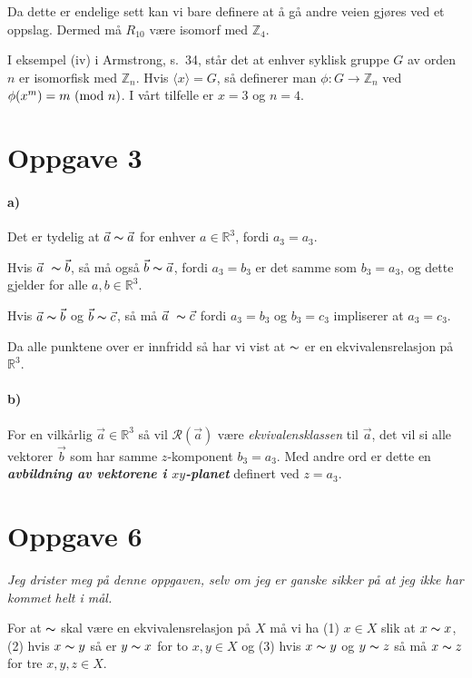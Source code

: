 \documentclass[a4paper,norsk,twocolumn,10pt]{article}
\begin{document}
Da dette er endelige sett kan vi bare definere at å gå andre veien gjøres ved
et oppslag. Dermed må $R_{10}$ være isomorf med $\mathbb{Z}_4$.

I eksempel (iv) i Armstrong, s.~34, står det at enhver syklisk gruppe $G$ av
orden $n$ er isomorfisk med $\mathbb{Z}_n$. Hvis $\langle x \rangle = G$, så
definerer man $\phi\colon G \rightarrow \mathbb{Z}_n$ ved $\phi{(x^m)} = m
\ (\text{mod}\ n)$. I vårt tilfelle er $x=3$ og $n=4$.

\section*{Oppgave 3}
\paragraph{\textbf{a)}}
Det er tydelig at $\vec{a} \thicksim \vec{a}$ for enhver $a\in \mathbb{R}^3$,
fordi $a_3=a_3$.

Hvis $\vec{a} \thicksim \vec{b}$, så må også $\vec{b} \thicksim \vec{a}$, fordi
$a_3=b_3$ er det samme som $b_3=a_3$, og dette gjelder for alle $a,b \in
\mathbb{R}^3$.

Hvis $\vec{a} \thicksim \vec{b}$ og $\vec{b} \thicksim \vec{c}$, så må
$\vec{a} \thicksim \vec{c}$ fordi $a_3=b_3$ og $b_3=c_3$ impliserer at
$a_3=c_3$.

Da alle punktene over er innfridd så har vi vist at $\thicksim$ er en
ekvivalensrelasjon på $\mathbb{R}^3$.

\paragraph{\textbf{b)}}
For en vilkårlig $\vec{a} \in \mathbb{R}^3$ så vil $\mathscr{R}(\vec{a})$ være
\textit{ekvivalensklassen} til $\vec{a}$, det vil si alle vektorer $\vec{b}$
som har samme $z$-komponent $b_3=a_3$. Med andre ord er dette en
\textbf{\textit{avbildning av vektorene i $xy$-planet}}
definert ved $z=a_3$.

\section*{Oppgave 6}
\textit{Jeg drister meg på denne oppgaven, selv om jeg er ganske sikker på at
jeg ikke har kommet helt i mål.}

For at $\thicksim$ skal være en ekvivalensrelasjon på $X$ må vi ha (1) $x\in X$
slik at $x \thicksim x$, (2) hvis $x \thicksim y$ så er $y \thicksim x$ for to
$x,y \in X$ og (3) hvis $x \thicksim y$ og $y \thicksim z$ så må $x \thicksim
z$ for tre $x,y,z \in X$.
\end{document}
